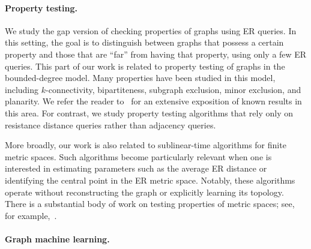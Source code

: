 \paragraph{Property testing.}
We study the gap version of checking properties of graphs using ER queries. In this setting, the goal is to distinguish between graphs that possess a certain property and those that are ``far'' from having that property, using only a few ER queries. This part of our work is related to property testing of graphs in the bounded-degree model. Many properties have been studied in this model, including $k$-connectivity, bipartiteness, subgraph exclusion, minor exclusion, and planarity. We refer the reader to~\citet{books/cu/Goldreich17} for an extensive exposition of known results in this area. 
For contrast, we study property testing algorithms that rely only on resistance distance queries rather than adjacency queries. 

More broadly, our work is also related to sublinear-time algorithms for finite metric spaces. Such algorithms become particularly relevant when one is interested in estimating parameters such as the average ER distance or identifying the central point in the ER metric space. Notably, these algorithms operate without reconstructing the graph or explicitly learning its topology. There is a substantial body of work on testing properties of metric spaces; see, for example,~\cite{conf/stoc/Indyk99,journals/iandc/ParnasR03,conf/icalp/Onak08}.

\paragraph{Graph machine learning.}

